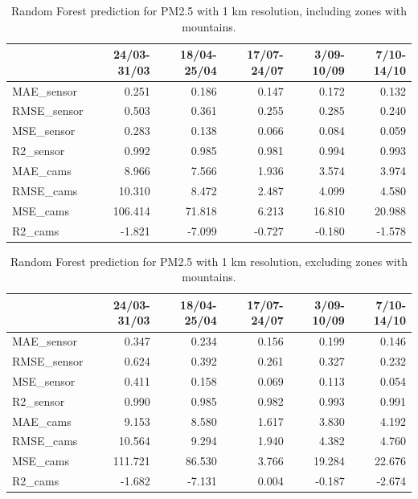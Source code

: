 \begin{table}[H]
\begin{tabular}{lrrrrr}
\toprule
 &  24/03-31/03 &  18/04-25/04 &  17/07-24/07 &  3/09-10/09 &  7/10-14/10 \\
\midrule
 MAE\_sensor &        0.251 &        0.186 &        0.147 &       0.172 &       0.132 \\
RMSE\_sensor &        0.503 &        0.361 &        0.255 &       0.285 &       0.240 \\
 MSE\_sensor &        0.283 &        0.138 &        0.066 &       0.084 &       0.059 \\
  R2\_sensor &        0.992 &        0.985 &        0.981 &       0.994 &       0.993 \\
   MAE\_cams &        8.966 &        7.566 &        1.936 &       3.574 &       3.974 \\
  RMSE\_cams &       10.310 &        8.472 &        2.487 &       4.099 &       4.580 \\
   MSE\_cams &      106.414 &       71.818 &        6.213 &      16.810 &      20.988 \\
    R2\_cams &       -1.821 &       -7.099 &       -0.727 &      -0.180 &      -1.578 \\
\bottomrule
\end{tabular}
\caption{Random Forest prediction for PM2.5 with 1 km resolution, including zones with mountains.}
\end{table}
\begin{table}[H]
\begin{tabular}{lrrrrr}
\toprule
 &  24/03-31/03 &  18/04-25/04 &  17/07-24/07 &  3/09-10/09 &  7/10-14/10 \\
\midrule
 MAE\_sensor &        0.347 &        0.234 &        0.156 &       0.199 &       0.146 \\
RMSE\_sensor &        0.624 &        0.392 &        0.261 &       0.327 &       0.232 \\
 MSE\_sensor &        0.411 &        0.158 &        0.069 &       0.113 &       0.054 \\
  R2\_sensor &        0.990 &        0.985 &        0.982 &       0.993 &       0.991 \\
   MAE\_cams &        9.153 &        8.580 &        1.617 &       3.830 &       4.192 \\
  RMSE\_cams &       10.564 &        9.294 &        1.940 &       4.382 &       4.760 \\
   MSE\_cams &      111.721 &       86.530 &        3.766 &      19.284 &      22.676 \\
    R2\_cams &       -1.682 &       -7.131 &        0.004 &      -0.187 &      -2.674 \\
\bottomrule
\end{tabular}
\caption{Random Forest prediction for PM2.5 with 1 km resolution, excluding zones with mountains.}
\end{table}
